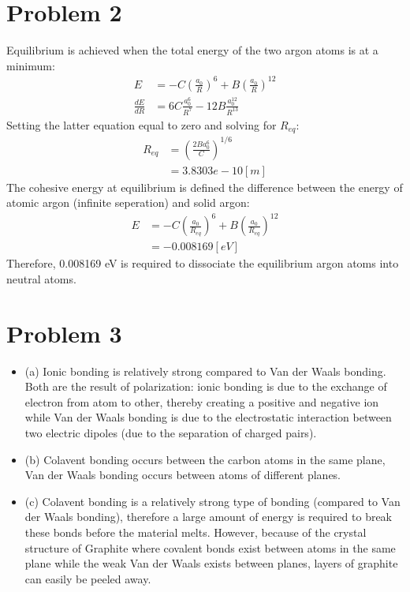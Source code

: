 \documentclass{article}
\numberwithin{equation}{section}
\begin{document}
\section*{Problem 2}
Equilibrium is achieved when the total energy of the two argon atoms is at a minimum:
\begin{align*}
	E&=-C(\frac{a_0}{R})^6+B(\frac{a_0}{R})^{12}\\
	\frac{dE}{dR}&=6C\frac{a_0^6}{R^7}-12B\frac{a_0^{12}}{R^{13}}
\end{align*}
Setting the latter equation equal to zero and solving for $R_{eq}$:
\begin{align*}
	R_{eq}&=(\frac{2Ba_0^6}{C})^{1/6}\\
	  &=3.8303e-10[m]
\end{align*}
The cohesive energy at equilibrium is defined the difference between the energy of atomic argon (infinite seperation) and solid argon:
\begin{align*}
	E&=-C(\frac{a_0}{R_{eq}})^6+B(\frac{a_0}{R_{eq}})^{12}\\
	 &=-0.008169[eV]
\end{align*}
Therefore, 0.008169 eV is required to dissociate the equilibrium argon atoms into neutral atoms. 


\section*{Problem 3}
\begin{itemize}
\item(a) Ionic bonding is relatively strong compared to Van der Waals bonding. Both are the result of polarization: ionic bonding is due to the exchange of electron from atom to other, thereby creating a positive and negative ion while Van der Waals bonding is due to the electrostatic interaction between two electric dipoles (due to the separation of charged pairs).

\item(b) Colavent bonding occurs between the carbon atoms in the same plane, Van der Waals bonding occurs between atoms of different planes.

\item(c) Colavent bonding is a relatively strong type of bonding (compared to Van der Waals bonding), therefore a large amount of energy is required to break these bonds before the material melts. However, because of the crystal structure of Graphite where covalent bonds exist between atoms in the same plane while the weak Van der Waals exists between planes, layers of graphite can easily be peeled away.

\end{itemize}
\end{document}
